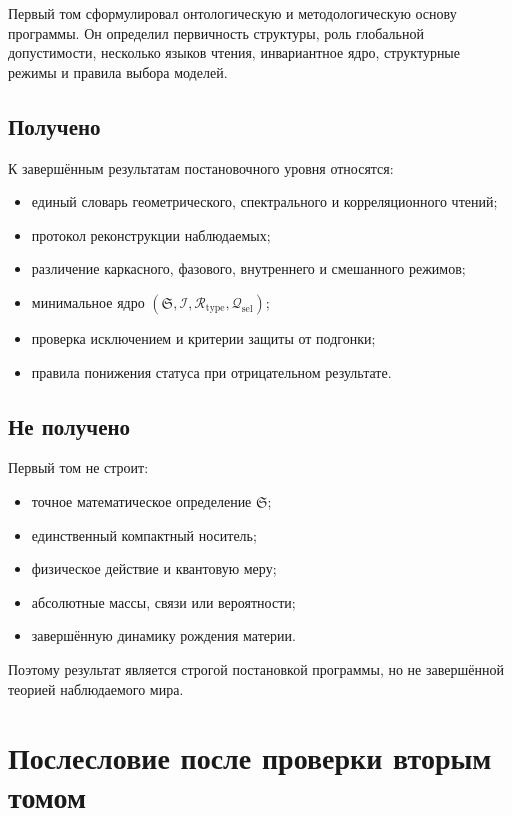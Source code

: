 Первый том сформулировал онтологическую и методологическую основу программы.
Он определил первичность структуры, роль глобальной допустимости, несколько
языков чтения, инвариантное ядро, структурные режимы и правила выбора моделей.

\section{Получено}

К завершённым результатам постановочного уровня относятся:
\begin{itemize}
 \item единый словарь геометрического, спектрального и корреляционного чтений;
 \item протокол реконструкции наблюдаемых;
 \item различение каркасного, фазового, внутреннего и смешанного режимов;
 \item минимальное ядро
       $(\mathfrak S,\mathcal I,\mathcal R_{\mathrm{type}},
       \mathcal Q_{\mathrm{sel}})$;
 \item проверка исключением и критерии защиты от подгонки;
 \item правила понижения статуса при отрицательном результате.
\end{itemize}

\section{Не получено}

Первый том не строит:
\begin{itemize}
 \item точное математическое определение $\mathfrak S$;
 \item единственный компактный носитель;
 \item физическое действие и квантовую меру;
 \item абсолютные массы, связи или вероятности;
 \item завершённую динамику рождения материи.
\end{itemize}

Поэтому результат является строгой постановкой программы, но не завершённой
теорией наблюдаемого мира.

\chapter{Послесловие после проверки вторым томом}

